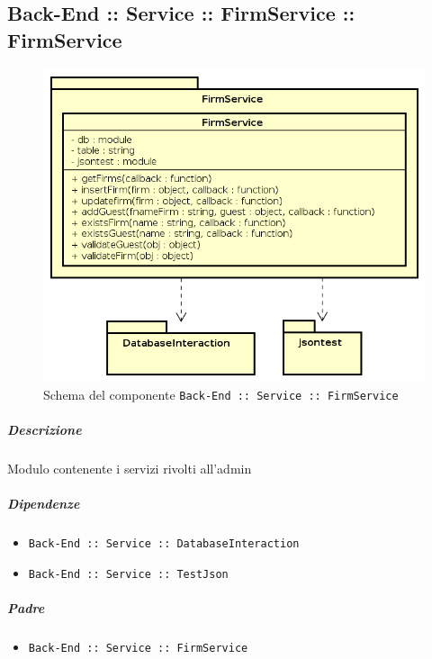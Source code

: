 \documentclass[../ManualeSviluppatore_v2.0.0.tex]{subfiles}
\begin{document}
\subsection{Back-End :: Service :: FirmService :: FirmService}
\begin{figure}[!h]
	\centering
	\includegraphics[scale=0.6]{Architettura/Back-End/Service/FirmService.png}
	\caption{Schema del componente \texttt{Back-End :: Service :: FirmService}}
\end{figure}
\subparagraph{Descrizione} Modulo contenente i servizi rivolti all'admin
\subparagraph{Dipendenze}
\begin{itemize}
	\item \texttt{Back-End :: Service :: DatabaseInteraction}
	\item \texttt{Back-End :: Service :: TestJson}
\end{itemize}
\subparagraph{Padre}
\begin{itemize}
	\item \texttt{Back-End :: Service :: FirmService}
\end{itemize}
\end{document}
